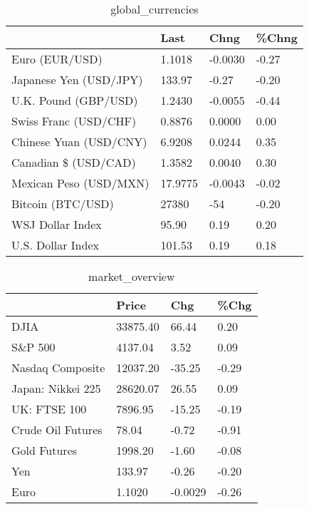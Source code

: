 \documentclass{article}%
\begin{document}
%


\begin{table}[htbp]%
\caption{global\_currencies}%
\centering%
\begin{adjustbox}{width=1\textwidth}%
\begin{tabular}{llll}
\toprule
                       &    Last &    Chng & \%Chng \\
\midrule
        Euro (EUR/USD) &  1.1018 & -0.0030 & -0.27 \\
Japanese Yen (USD/JPY) &  133.97 &   -0.27 & -0.20 \\
  U.K. Pound (GBP/USD) &  1.2430 & -0.0055 & -0.44 \\
 Swiss Franc (USD/CHF) &  0.8876 &  0.0000 &  0.00 \\
Chinese Yuan (USD/CNY) &  6.9208 &  0.0244 &  0.35 \\
  Canadian \$ (USD/CAD) &  1.3582 &  0.0040 &  0.30 \\
Mexican Peso (USD/MXN) & 17.9775 & -0.0043 & -0.02 \\
     Bitcoin (BTC/USD) &   27380 &     -54 & -0.20 \\
      WSJ Dollar Index &   95.90 &    0.19 &  0.20 \\
     U.S. Dollar Index &  101.53 &    0.19 &  0.18 \\
\bottomrule
\end{tabular}
%
\end{adjustbox}%
\end{table}

%


\begin{table}[htbp]%
\caption{market\_overview}%
\centering%
\begin{adjustbox}{width=1\textwidth}%
\begin{tabular}{llll}
\toprule
                  &    Price &     Chg &  \%Chg \\
\midrule
             DJIA & 33875.40 &   66.44 &  0.20 \\
          S\&P 500 &  4137.04 &    3.52 &  0.09 \\
 Nasdaq Composite & 12037.20 &  -35.25 & -0.29 \\
Japan: Nikkei 225 & 28620.07 &   26.55 &  0.09 \\
     UK: FTSE 100 &  7896.95 &  -15.25 & -0.19 \\
Crude Oil Futures &    78.04 &   -0.72 & -0.91 \\
     Gold Futures &  1998.20 &   -1.60 & -0.08 \\
              Yen &   133.97 &   -0.26 & -0.20 \\
             Euro &   1.1020 & -0.0029 & -0.26 \\
\bottomrule
\end{tabular}
%
\end{adjustbox}%
\end{table}

%
\end{document}
